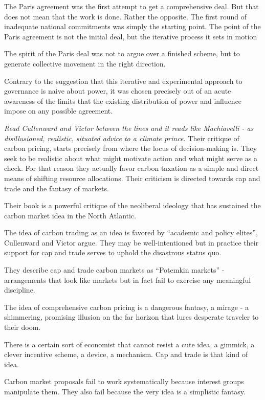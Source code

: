 \documentclass[
]{book}
\begin{document}
The Paris agreement was the first attempt to get a comprehensive deal. But that does not mean that the work is done. Rather the opposite. The first round of inadequate national commitments was simply the starting point. The point of the Paris agreement is not the initial deal, but the iterative process it sets in motion

The spirit of the Paris deal was not to argue over a finished scheme, but to generate collective movement in the right direction.

Contrary to the suggestion that this iterative and experimental approach to governance is naive about power, it was chosen precisely out of an acute awareness of the limits that the existing distribution of power and influence impose on any possible agreement.

\emph{Read Cullenward and Victor between the lines and it reads like Machiavelli - as disillusioned, realistic, situated advice to a climate prince.}
Their critique of carbon pricing, starts precisely from where the locus of decision-making is. They seek to be realistic about what might motivate action and what might serve as a check. For that reason they actually favor carbon taxation as a simple and direct means of shifting resource allocations. Their criticism is directed towards cap and trade and the fantasy of markets.

Their book is a powerful critique of the neoliberal ideology that has sustained the carbon market idea in the North Atlantic.

The idea of carbon trading as an idea is favored by ``academic and policy elites'', Cullenward and Victor argue. They may be well-intentioned but in practice their support for cap and trade serves to uphold the disastrous status quo.

They describe cap and trade carbon markets as ``Potemkin markets'' - arrangements that look like markets but in fact fail to exercise any meaningful discipline.

The idea of comprehensive carbon pricing is a dangerous fantasy, a mirage - a shimmering, promising illusion on the far horizon that lures desperate traveler to their doom.

There is a certain sort of economist that cannot resist a cute idea, a gimmick, a clever incentive scheme, a device, a mechanism. Cap and trade is that kind of idea.

Carbon market proposals fail to work systematically because interest groups manipulate them. They also fail because the very idea is a simplistic fantasy.
\end{document}
